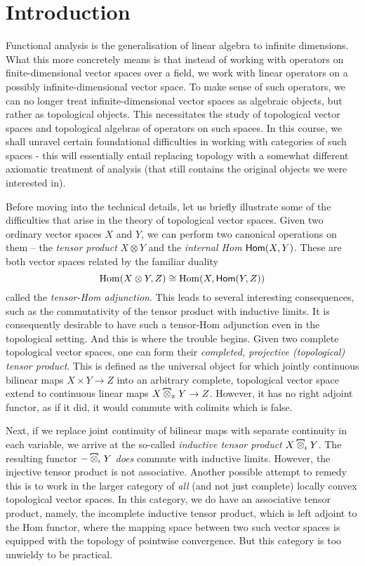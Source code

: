 \chapter*{Introduction}

Functional analysis is the generalisation of linear algebra to infinite dimensions. What this more concretely means is that instead of working with operators on finite-dimensional vector spaces over a field, we work with linear operators on a possibly infinite-dimensional vector space. To make sense of such operators, we can no longer treat infinite-dimensional vector spaces as algebraic objects, but rather as topological objects. This necessitates the study of topological vector spaces and topological algebras of operators on such spaces. In this course, we shall unravel certain foundational difficulties in working with categories of such spaces - this will essentially entail replacing topology with a somewhat different axiomatic treatment of analysis (that still contains the original objects we were interested in). 

Before moving into the technical details, let us briefly illustrate some of the difficulties that arise in the theory of topological vector spaces. Given two ordinary vector spaces \(X\) and \(Y\), we can perform two canonical operations on them -- the \emph{tensor product} \(X \otimes Y\) and the \emph{internal Hom} \(\mathsf{Hom}(X,Y)\). These are both vector spaces related by the familiar duality \[\operatorname{Hom}(X \otimes Y, Z) \cong \operatorname{Hom}(X, \mathsf{Hom}(Y,Z))\] called the \emph{tensor-Hom adjunction}. This leads to several interesting consequences, such as the commutativity of the tensor product with inductive limits. It is consequently desirable to have such a tensor-Hom adjunction even in the topological setting. And this is where the trouble begins. Given two complete topological vector spaces, one can form their \emph{completed, projective (topological) tensor product}. This is defined as the universal object for which jointly continuous bilinear maps \(X \times Y \to Z\) into an arbitrary complete, topological vector space  extend to  continuous linear maps \(X \hot_{\pi} Y \to Z\). However, it has no right adjoint functor, as if it did, it would commute with colimits which is false. 

Next, if we replace joint continuity of bilinear maps with separate continuity in each variable, we arrive at the so-called \emph{inductive tensor product} \(X \hot_\iota Y\). The resulting functor \(- \hot_\iota Y\) \emph{does} commute with inductive limits. However, the injective tensor product is not associative. Another possible attempt to remedy this is to work in the larger category of \emph{all} (and not just complete) locally convex topological vector spaces. In this category, we do have an associative tensor product, namely, the incomplete inductive tensor product, which is left adjoint to the Hom functor, where the mapping space between two such vector spaces is equipped with the topology of pointwise convergence. But this category is too unwieldy to be practical. 

